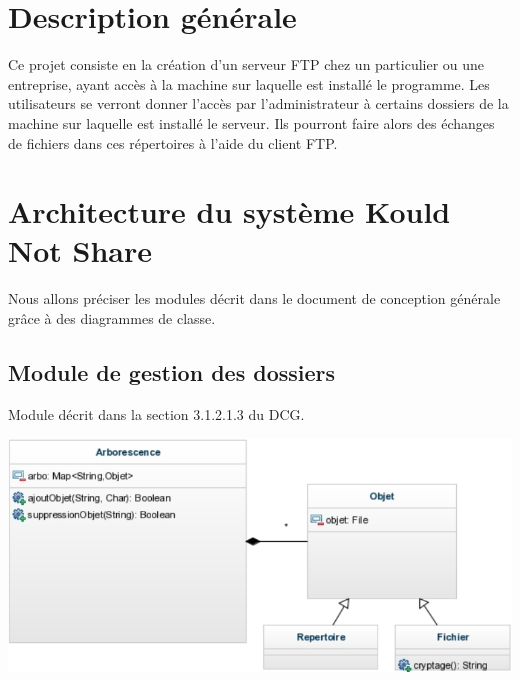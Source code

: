 \documentclass[10pt,a4paper]{report}
\begin{document}
\section{Description générale}

Ce projet consiste en la création d'un serveur FTP chez un particulier ou une entreprise, ayant accès à la machine sur laquelle est installé le programme. Les utilisateurs se verront donner l'accès par l'administrateur à certains dossiers de la machine sur laquelle est installé le serveur. Ils pourront faire alors des échanges de fichiers dans ces répertoires à l'aide du client FTP.\\

\newpage

\section{Architecture du système Kould Not Share}
Nous allons préciser les modules décrit dans le document de conception générale grâce à des diagrammes de classe.
\subsection{Module de gestion des dossiers}
Module décrit dans la section 3.1.2.1.3 du DCG.
\begin{center}
	\includegraphics[scale=0.5]{./Ressources/modules_doss.png}\\
\end{center}

\hspace{5cm}
\end{document}
